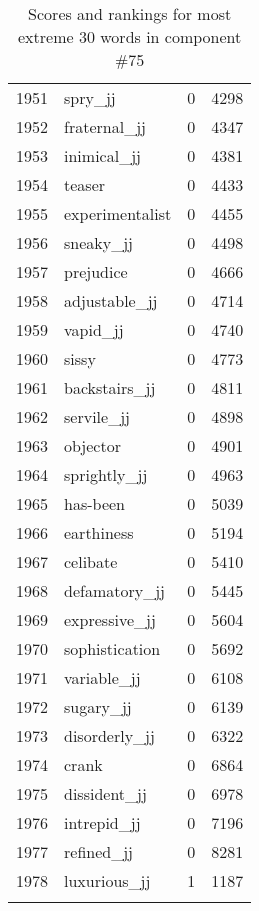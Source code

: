 \begin{longtable}[!htbp]{| rlr@{.}l |}
    1951 & spry\_jj & 0 & 4298 \\
    1952 & fraternal\_jj & 0 & 4347 \\
    1953 & inimical\_jj & 0 & 4381 \\
    1954 & teaser & 0 & 4433 \\
    1955 & experimentalist & 0 & 4455 \\
    1956 & sneaky\_jj & 0 & 4498 \\
    1957 & prejudice & 0 & 4666 \\
    1958 & adjustable\_jj & 0 & 4714 \\
    1959 & vapid\_jj & 0 & 4740 \\
    1960 & sissy & 0 & 4773 \\
    1961 & backstairs\_jj & 0 & 4811 \\
    1962 & servile\_jj & 0 & 4898 \\
    1963 & objector & 0 & 4901 \\
    1964 & sprightly\_jj & 0 & 4963 \\
    1965 & has-been & 0 & 5039 \\
    1966 & earthiness & 0 & 5194 \\
    1967 & celibate & 0 & 5410 \\
    1968 & defamatory\_jj & 0 & 5445 \\
    1969 & expressive\_jj & 0 & 5604 \\
    1970 & sophistication & 0 & 5692 \\
    1971 & variable\_jj & 0 & 6108 \\
    1972 & sugary\_jj & 0 & 6139 \\
    1973 & disorderly\_jj & 0 & 6322 \\
    1974 & crank & 0 & 6864 \\
    1975 & dissident\_jj & 0 & 6978 \\
    1976 & intrepid\_jj & 0 & 7196 \\
    1977 & refined\_jj & 0 & 8281 \\
    1978 & luxurious\_jj & 1 & 1187 \\
    \hline
    \caption{Scores and rankings for most extreme 30 words in component \#75} \\
\end{longtable}
